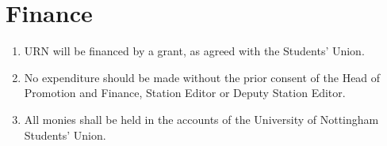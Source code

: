 \section{Finance}

\begin{enumerate}[label*=\thesection.\arabic*.]
    \item URN will be financed by a grant, as agreed with the Students' Union.
    \item No expenditure should be made without the prior consent of the Head of Promotion and Finance, Station Editor or Deputy Station Editor.
    \item All monies shall be held in the accounts of the University of Nottingham Students' Union.
\end{enumerate}

